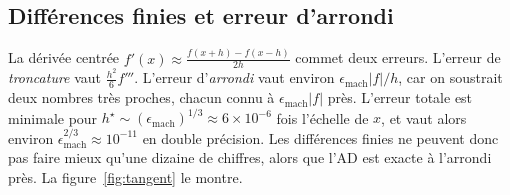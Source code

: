 \subsection{Différences finies et erreur d'arrondi}\label{sec:df}

La dérivée centrée $f'(x)\approx\frac{f(x+h)-f(x-h)}{2h}$ commet deux erreurs. L'erreur de \emph{troncature} vaut $\frac{h^2}{6}f'''$. L'erreur d'\emph{arrondi} vaut environ $\epsilon_{\mathrm{mach}}|f|/h$, car on soustrait deux nombres très proches, chacun connu à $\epsilon_{\mathrm{mach}}|f|$ près. L'erreur totale est minimale pour $h^\star\sim(\epsilon_{\mathrm{mach}})^{1/3}\approx 6\times10^{-6}$ fois l'échelle de $x$, et vaut alors environ $\epsilon_{\mathrm{mach}}^{2/3}\approx10^{-11}$ en double précision. Les différences finies ne peuvent donc pas faire mieux qu'une dizaine de chiffres, alors que l'AD est exacte à l'arrondi près. La figure~\ref{fig:tangent} le montre.
